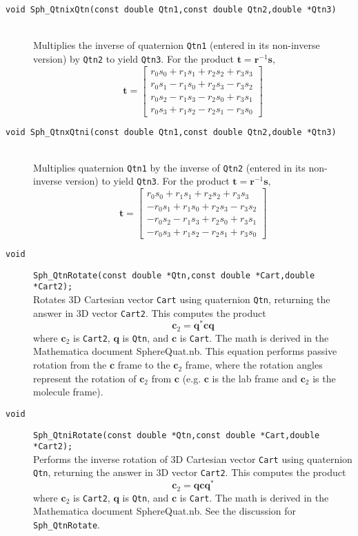 \documentclass[11pt]{article}
\newcommand {\ttt} {\texttt}
\begin{document}
\begin{description}
\item[\ttt{void Sph\_QtnixQtn(const double Qtn1,const double Qtn2,double *Qtn3)}]
\hfill \\
Multiplies the inverse of quaternion \ttt{Qtn1} (entered in its non-inverse version) by \ttt{Qtn2} to yield \ttt{Qtn3}. For the product $\bm{t}=\bm{r}^{-1}\bm{s}$,
$$\bm{t}=\left[\begin{array}{c}
r_0s_0 + r_1s_1 + r_2s_2 + r_3s_3 \\
r_0s_1 - r_1s_0 + r_2s_3 - r_3s_2 \\
r_0s_2 - r_1s_3 - r_2s_0 + r_3s_1 \\
r_0s_3 + r_1s_2 - r_2s_1 - r_3s_0
\end{array} \right]$$


\item[\ttt{void Sph\_QtnxQtni(const double Qtn1,const double Qtn2,double *Qtn3)}]
\hfill \\
Multiplies quaternion \ttt{Qtn1} by the inverse of \ttt{Qtn2} (entered in its non-inverse version) to yield \ttt{Qtn3}. For the product $\bm{t}=\bm{r}^{-1}\bm{s}$,
$$\bm{t}=\left[\begin{array}{c}
r_0s_0 + r_1s_1 + r_2s_2 + r_3s_3 \\
-r_0s_1 + r_1s_0 + r_2s_3 - r_3s_2 \\
-r_0s_2 - r_1s_3 + r_2s_0 + r_3s_1 \\
-r_0s_3 + r_1s_2 - r_2s_1 + r_3s_0
\end{array} \right]$$


\item[\ttt{void}]
\ttt{Sph\_QtnRotate(const double *Qtn,const double *Cart,double *Cart2);}
\hfill \\
Rotates 3D Cartesian vector \ttt{Cart} using quaternion \ttt{Qtn}, returning the answer in 3D vector \ttt{Cart2}. This computes the product
$$\bm{c}_2 = \bm{q}^* \bm{c} \bm{q}$$
where $\bm{c}_2$ is \ttt{Cart2}, $\bm{q}$ is \ttt{Qtn}, and $\bm{c}$ is \ttt{Cart}. The math is derived in the Mathematica document SphereQuat.nb. This equation performs passive rotation from the $\bm{c}$ frame to the $\bm{c}_2$ frame, where the rotation angles represent the rotation of $\bm{c}_2$ from $\bm{c}$ (e.g. $\bm{c}$ is the lab frame and $\bm{c}_2$ is the molecule frame).


\item[\ttt{void}]
\ttt{Sph\_QtniRotate(const double *Qtn,const double *Cart,double *Cart2);}
\hfill \\
Performs the inverse rotation of 3D Cartesian vector \ttt{Cart} using quaternion \ttt{Qtn}, returning the answer in 3D vector \ttt{Cart2}. This computes the product
$$\bm{c}_2 = \bm{q} \bm{c} \bm{q}^*$$
where $\bm{c}_2$ is \ttt{Cart2}, $\bm{q}$ is \ttt{Qtn}, and $\bm{c}$ is \ttt{Cart}. The math is derived in the Mathematica document SphereQuat.nb. See the discussion for \ttt{Sph\_QtnRotate}.



\end{description}
\end{document}

